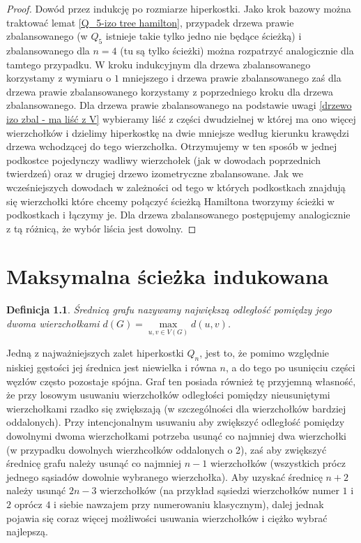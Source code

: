 \documentclass{pracamgr}
\newtheorem{defi}{Definicja}[section] %
\begin{document}
    \begin{proof}
     Dowód przez indukcję po rozmiarze hiperkostki. Jako krok bazowy można traktować lemat \ref{Q_5-izo tree hamilton}, przypadek drzewa prawie zbalansowanego
     (w $Q_5$ istnieje takie tylko jedno nie będące ścieżką) i zbalansowanego dla $n=4$ (tu są tylko ścieżki) można rozpatrzyć analogicznie dla tamtego przypadku.
     W kroku indukcyjnym dla drzewa zbalansowanego korzystamy z wymiaru o $1$ mniejszego i drzewa prawie zbalansowanego 
     zaś dla drzewa prawie zbalansowanego korzystamy z poprzedniego kroku dla drzewa zbalansowanego.
     Dla drzewa prawie zbalansowanego na podstawie uwagi \ref{drzewo izo zbal - ma liść z V} wybieramy liść
     z części dwudzielnej w której ma ono więcej wierzchołków i dzielimy hiperkostkę na dwie mniejsze według kierunku krawędzi drzewa
     wchodzącej do tego wierzchołka. Otrzymujemy w ten sposób w jednej podkostce pojedynczy wadliwy wierzchołek (jak w dowodach poprzednich twierdzeń)
     oraz w drugiej drzewo izometryczne zbalansowane. Jak we wcześniejszych dowodach w zależności od tego w których podkostkach znajdują się wierzchołki
     które chcemy połączyć ścieżką Hamiltona tworzymy ścieżki w podkostkach i łączymy je. Dla drzewa zbalansowanego postępujemy analogicznie z tą różnicą,
     że wybór liścia jest dowolny.
    \end{proof}

  \chapter{Maksymalna ścieżka indukowana}%
   \begin{defi}\label{srednica grafu}
    \emph{Średnicą grafu} nazywamy największą odległość pomiędzy jego dwoma wierzchołkami $d(G)=\max\limits_{u,v\in V(G)}d(u,v)$.
   \end{defi}
   Jedną z najważniejszych zalet hiperkostki $Q_n$, jest to, że pomimo względnie niskiej gęstości jej średnica jest niewielka i równa $n$,
   a do tego po usunięciu części węzłów często pozostaje spójna.
   Graf ten posiada również tę przyjemną własność, że przy losowym usuwaniu wierzchołków odległości pomiędzy nieusuniętymi wierzchołkami rzadko się zwiększają
   (w szczególności dla wierzchołków bardziej oddalonych).
   Przy intencjonalnym usuwaniu aby zwiększyć odległość pomiędzy dowolnymi dwoma wierzchołkami potrzeba usunąć co najmniej dwa wierzchołki
   (w przypadku dowolnych wierzhcołków oddalonych o 2), zaś aby zwiększyć średnicę grafu należy usunąć co najmniej $n-1$ wierzchołków
   (wszystkich prócz jednego sąsiadów dowolnie wybranego wierzchołka).
   Aby uzyskać średnicę $n+2$ należy usunąć $2n-3$ wierzchołków
   (na przykład sąsiedzi wierzchołków numer $1$ i $2$ oprócz $4$ i siebie nawzajem przy numerowaniu klasycznym),
   dalej jednak pojawia się coraz więcej możliwości usuwania wierzchołków i ciężko wybrać najlepszą.
    
\end{document}

